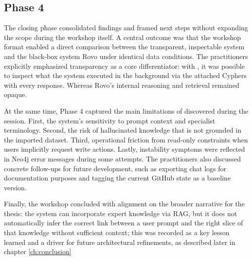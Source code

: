 \subsection{Phase 4}
\label{sub:phase4}
The closing phase consolidated findings and framed next steps without expanding the scope during the workshop itself. A central outcome was that the workshop format enabled a direct comparison between the transparent, inspectable system \prototype{} and the black-box system Rovo under identical data conditions. The practitioners explicitly emphasized transparency as a core differentiator: with \prototype{}, it was possible to inspect what the system executed in the background via the attached Cyphers with every response. Whereas Rovo’s internal reasoning and retrieval remained opaque.

At the same time, Phase 4 captured the main limitations of \prototype{} discovered during the session. First, the system’s sensitivity to prompt context and specialist terminology. Second, the risk of hallucinated knowledge that is not grounded in the imported dataset. Third, operational friction from read-only constraints when users implicitly request write actions. Lastly, instability symptoms were reflected in Neo4j error messages during some attempts. The practitioners also discussed concrete follow-ups for future development, such as exporting chat logs for documentation purposes and tagging the current GitHub state as a baseline version.

Finally, the workshop concluded with alignment on the broader narrative for the thesis: the system can incorporate expert knowledge via RAG, but it does not automatically infer the correct link between a user prompt and the right slice of that knowledge without sufficient context; this was recorded as a key lesson learned and a driver for future architectural refinements, as described later in chapter \ref{ch:conclusion}



